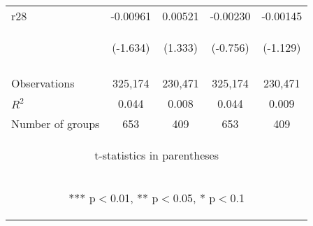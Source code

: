 \documentclass[]{article}
\begin{document}
\begin{center}
\begin{tabular}{lcccc}
r28 & -0.00961 & 0.00521 & -0.00230 & -0.00145 \\
 & \begin{footnotesize}(-1.634)\end{footnotesize} & \begin{footnotesize}(1.333)\end{footnotesize} & \begin{footnotesize}(-0.756)\end{footnotesize} & \begin{footnotesize}(-1.129)\end{footnotesize} \\
\vspace{4pt} & \begin{footnotesize}\end{footnotesize} & \begin{footnotesize}\end{footnotesize} & \begin{footnotesize}\end{footnotesize} & \begin{footnotesize}\end{footnotesize} \\
Observations & 325,174 & 230,471 & 325,174 & 230,471 \\
$R^2$ & 0.044 & 0.008 & 0.044 & 0.009 \\
 Number of groups & 653 & 409 & 653 & 409 \\ \hline
\multicolumn{5}{c}{\begin{footnotesize} t-statistics in parentheses\end{footnotesize}} \\
\multicolumn{5}{c}{\begin{footnotesize} *** p$<$0.01, ** p$<$0.05, * p$<$0.1\end{footnotesize}} \\
\end{tabular}
\end{center}
\end{document}

